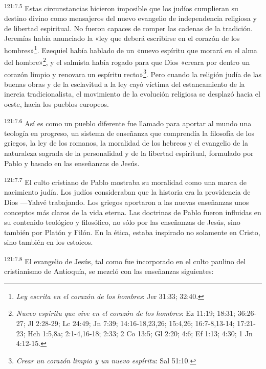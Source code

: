 \par
\textsuperscript{121:7.5} Estas circunstancias hicieron imposible que los judíos cumplieran su destino divino como mensajeros del nuevo evangelio de independencia religiosa y de libertad espiritual. No fueron capaces de romper las cadenas de la tradición. Jeremías había anunciado la «ley que deberá escribirse en el corazón de los hombres»\footnote{\textit{Ley escrita en el corazón de los hombres}: Jer 31:33; 32:40.}. Ezequiel había hablado de un «nuevo espíritu que morará en el alma del hombre»\footnote{\textit{Nuevo espiritu que vive en el corazón de los hombres}: Ez 11:19; 18:31; 36:26-27; Jl 2:28-29; Lc 24:49; Jn 7:39; 14:16-18,23,26; 15:4,26; 16:7-8,13-14; 17:21-23; Hch 1:5,8a; 2:1-4,16-18; 2:33; 2 Co 13:5; Gl 2:20; 4:6; Ef 1:13; 4:30; 1 Jn 4:12-15.}, y el salmista había rogado para que Dios «creara por dentro un corazón limpio y renovara un espíritu recto»\footnote{\textit{Crear un corazón limpio y un nuevo espíritu}: Sal 51:10.}. Pero cuando la religión judía de las buenas obras y de la esclavitud a la ley cayó víctima del estancamiento de la inercia tradicionalista, el movimiento de la evolución religiosa se desplazó hacia el oeste, hacia los pueblos europeos.

\par
\textsuperscript{121:7.6} Así es como un pueblo diferente fue llamado para aportar al mundo una teología en progreso, un sistema de enseñanza que comprendía la filosofía de los griegos, la ley de los romanos, la moralidad de los hebreos y el evangelio de la naturaleza sagrada de la personalidad y de la libertad espiritual, formulado por Pablo y basado en las enseñanzas de Jesús.

\par
\textsuperscript{121:7.7} El culto cristiano de Pablo mostraba su moralidad como una marca de nacimiento judía. Los judíos consideraban que la historia era la providencia de Dios ---Yahvé trabajando. Los griegos aportaron a las nuevas enseñanzas unos conceptos más claros de la vida eterna. Las doctrinas de Pablo fueron influidas en su contenido teológico y filosófico, no sólo por las enseñanzas de Jesús, sino también por Platón y Filón. En la ética, estaba inspirado no solamente en Cristo, sino también en los estoicos.

\par
\textsuperscript{121:7.8} El evangelio de Jesús, tal como fue incorporado en el culto paulino del cristianismo de Antioquía, se mezcló con las enseñanzas siguientes:

